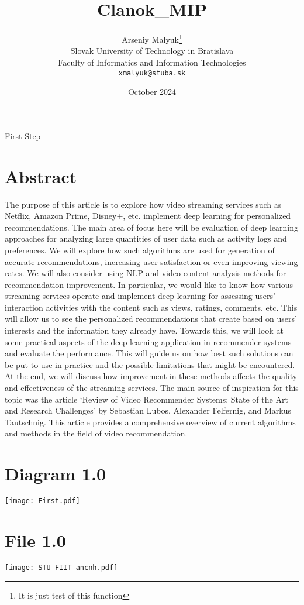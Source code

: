 \documentclass[10pt,twocolumn,twoside,a4paper]{article}
\title{Clanok_MIP}
\author{Arseniy Malyuk\thanks{It is just test of this function}\\[2pt]
	{\small Slovak University of Technology in Bratislava}\\
	{\small Faculty of Informatics and Information Technologies}\\
	{\small \texttt{xmalyuk@stuba.sk}}
	}
\date{October 2024}
\begin{document}
\maketitle
First Step

\section{Abstract}
The purpose of this article is to explore how video streaming services such as Netflix, Amazon Prime, Disney+, etc. implement deep learning for personalized recommendations. The main area of focus here will be evaluation of deep learning approaches for analyzing large quantities of user data such as activity logs and preferences. We will explore how such algorithms are used for generation of accurate recommendations, increasing user satisfaction or even improving viewing rates. We will also consider using NLP and video content analysis methods for recommendation improvement. In particular, we would like to know how various streaming services operate and implement deep learning for assessing users’ interaction activities with the content such as views, ratings, comments, etc. This will allow us to see the personalized recommendations that create based on users’ interests and the information they already have. Towards this, we will look at some practical aspects of the deep learning application in recommender systems and evaluate the performance. This will guide us on how best such solutions can be put to use in practice and the possible limitations that might be encountered. At the end, we will discuss how improvement in these methods affects the quality and effectiveness of the streaming services. The main source of inspiration for this topic was the article ‘Review of Video Recommender Systems: State of the Art and Research Challenges’ by Sebastian Lubos, Alexander Felfernig, and Markus Tautschnig. This article provides a comprehensive overview of current algorithms and methods in the field of video recommendation.

\section{Diagram 1.0}
\texttt{[image: First.pdf]}

\section{File 1.0}
\texttt{[image: STU-FIIT-ancnh.pdf]}
\end{document}
